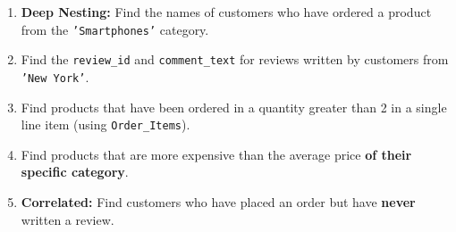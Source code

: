 \documentclass[12pt,a4paper]{article}
\begin{document}
\begin{enumerate}
    \item \textbf{Deep Nesting:} Find the names of customers who have ordered a product from the \texttt{'Smartphones'} category.

    \item Find the \texttt{review\_id} and \texttt{comment\_text} for reviews written by customers from \texttt{'New York'}.

    \item Find products that have been ordered in a quantity greater than 2 in a single line item (using \texttt{Order\_Items}).

    \item Find products that are more expensive than the average price \textbf{of their specific category}.

    \item \textbf{Correlated:} Find customers who have placed an order but have \textbf{never} written a review.



\end{enumerate}
\end{document}
